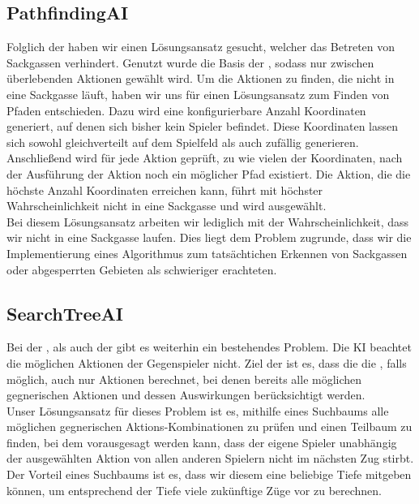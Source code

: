 \subsection{PathfindingAI}
\label{subsec:pathfinding-ai}

Folglich der  haben wir einen Lösungsansatz gesucht, welcher das Betreten von Sackgassen
verhindert.
Genutzt wurde die Basis der , sodass nur zwischen überlebenden Aktionen gewählt wird.
Um die Aktionen zu finden, die nicht in eine Sackgasse läuft, haben wir uns für einen Lösungsansatz zum Finden von
Pfaden entschieden.
Dazu wird eine konfigurierbare Anzahl Koordinaten generiert, auf denen sich bisher kein Spieler befindet.
Diese Koordinaten lassen sich sowohl gleichverteilt auf dem Spielfeld als auch zufällig generieren.
Anschließend wird für jede Aktion geprüft, zu wie vielen der Koordinaten, nach der Ausführung der Aktion noch ein
möglicher Pfad existiert. 
Die Aktion, die die höchste Anzahl Koordinaten erreichen kann, führt mit höchster Wahrscheinlichkeit
nicht in eine Sackgasse und wird ausgewählt. \\

Bei diesem Lösungsansatz arbeiten wir lediglich mit der Wahrscheinlichkeit, dass wir nicht in eine Sackgasse laufen.
Dies liegt dem Problem zugrunde, dass wir die Implementierung eines Algorithmus zum tatsächtichen Erkennen von
Sackgassen oder abgesperrten Gebieten als schwieriger erachteten.

\subsection{SearchTreeAI}
\label{subsec:searchtree-ai}

Bei der , als auch der  gibt es weiterhin ein bestehendes
Problem.
Die \ac{KI} beachtet die möglichen Aktionen der Gegenspieler nicht.
Ziel der  ist es, dass die die , falls möglich, auch nur Aktionen berechnet,
bei denen bereits alle möglichen gegnerischen Aktionen und dessen Auswirkungen berücksichtigt werden. \\

Unser Lösungsansatz für dieses Problem ist es, mithilfe eines Suchbaums alle möglichen gegnerischen
Aktions-Kombinationen zu prüfen und einen Teilbaum zu finden, bei dem vorausgesagt werden kann, dass
der eigene Spieler unabhängig der ausgewählten Aktion von allen anderen Spielern nicht im nächsten Zug stirbt.
Der Vorteil eines Suchbaums ist es, dass wir diesem eine
beliebige Tiefe mitgeben können, um entsprechend der Tiefe viele zukünftige Züge vor zu berechnen.
